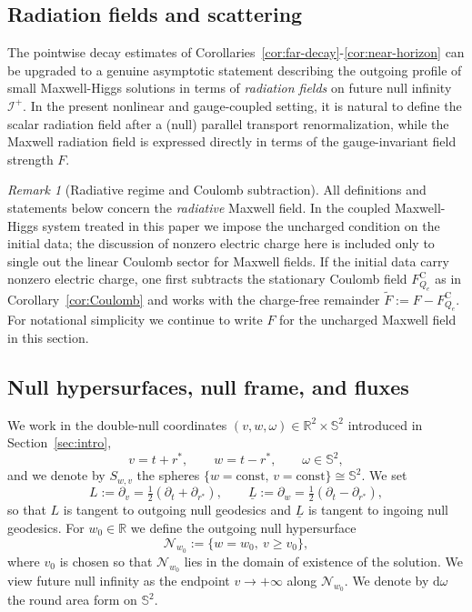 \documentclass[11pt]{article}
\numberwithin{equation}{section}
\theoremstyle{plain}
\theoremstyle{definition}
\theoremstyle{remark}
\newtheorem{remark}{Remark}[section]
\newcommand{\dd}{\mathrm{d}}
\begin{document}
\subsection{Radiation fields and scattering}
\label{sec:scattering}

The pointwise decay estimates of Corollaries~\ref{cor:far-decay}-\ref{cor:near-horizon} can be upgraded to a genuine asymptotic statement describing the outgoing profile of small Maxwell-Higgs solutions in terms of \emph{radiation fields} on future null infinity $\mathcal{I}^+$.
In the present nonlinear and gauge-coupled setting, it is natural to define the scalar radiation field after a (null) parallel transport renormalization, while the Maxwell radiation field is expressed directly in terms of the gauge-invariant field strength $F$.

\begin{remark}[Radiative regime and Coulomb subtraction]\label{rem:coulomb-subtraction-scattering}
All definitions and statements below concern the \emph{radiative} Maxwell field.
In the coupled Maxwell-Higgs system treated in this paper we impose the uncharged condition on the initial data; the discussion of nonzero electric charge here is included only to single out the linear Coulomb sector for Maxwell fields.
If the initial data carry nonzero electric charge, one first subtracts the stationary Coulomb field $F^{\mathrm C}_{Q_e}$ as in Corollary~\ref{cor:Coulomb} and works with the charge-free remainder $\widetilde F:=F-F^{\mathrm C}_{Q_e}$.
For notational simplicity we continue to write $F$ for the uncharged Maxwell field in this section.
\end{remark}

\subsection{Null hypersurfaces, null frame, and fluxes}
\label{subsec:null-hypersurfaces}

We work in the double-null coordinates $(v,w,\omega)\in\mathbb{R}^2\times\mathbb{S}^2$ introduced in Section~\ref{sec:intro},
\begin{equation}
v=t+r^\ast,\qquad w=t-r^\ast,\qquad \omega\in\mathbb{S}^2,
\end{equation}
and we denote by $S_{w,v}$ the spheres $\{w=\mathrm{const},\,v=\mathrm{const}\}\cong \mathbb{S}^2$.
We set
\begin{equation}
L:=\partial_v=\tfrac12(\partial_t+\partial_{r^\ast}),\qquad
\underline L:=\partial_w=\tfrac12(\partial_t-\partial_{r^\ast}),
\end{equation}
so that $L$ is tangent to outgoing null geodesics and $\underline L$ is tangent to ingoing null geodesics.
For $w_0\in\mathbb{R}$ we define the outgoing null hypersurface
\begin{equation}
\mathcal{N}_{w_0}:=\{w=w_0,\ v\ge v_0\},
\end{equation}
where $v_0$ is chosen so that $\mathcal{N}_{w_0}$ lies in the domain of existence of the solution.
We view future null infinity as the endpoint $v\to +\infty$ along $\mathcal{N}_{w_0}$.
We denote by $\dd\omega$ the round area form on $\mathbb{S}^2$.
\end{document}
